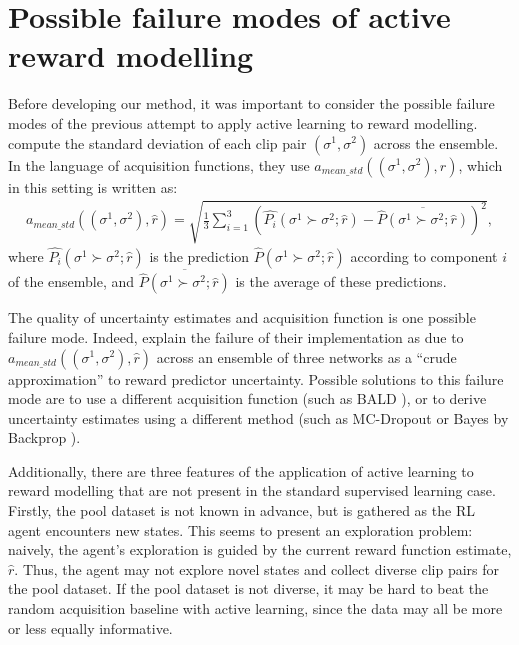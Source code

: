 \documentclass[11pt, a4paper, bibliography=totoc]{report}
\newcommand{\rp}{\hat{r}}
\begin{document}
\section{Possible failure modes of active reward modelling} \label{sec:failure}
Before developing our method, it was important to consider the possible failure modes of the previous attempt to apply active learning to reward modelling. \cite{Christiano2017} compute the standard deviation of each clip pair $(\sigma^1, \sigma^2)$ across the ensemble. In the language of acquisition functions, they use $ a_{mean\_std}((\sigma^1, \sigma^2), \rp) $, which in this setting is written as:
\begin{align*}
a_{mean\_std}((\sigma^1, \sigma^2), \rp) = \sqrt{\frac{1}{3}\sum_{i=1}^{3}\left(\hat{P_i}(\sigma^1 \succ \sigma^2  ; \rp) - \overline{\hat{P}(\sigma^1 \succ \sigma^2  ; \rp)}\right)^2},
\end{align*}
where $ \hat{P_i}(\sigma^1 \succ \sigma^2  ; \rp) $ is the prediction $ \hat{P}(\sigma^1 \succ \sigma^2  ; \rp) $ according to component $ i $ of the ensemble, and $ \overline{\hat{P}(\sigma^1 \succ \sigma^2  ; \rp)} $ is the average of these predictions.

The quality of uncertainty estimates and acquisition function is one possible failure mode. Indeed, \cite[p.~6]{Christiano2017} explain the failure of their implementation as due to $ a_{mean\_std}((\sigma^1, \sigma^2), \rp) $ across an ensemble of three networks as a ``crude approximation'' to reward predictor uncertainty. Possible solutions to this failure mode are to use a different acquisition function (such as BALD \cite{Houlsby2011}), or to derive uncertainty estimates using a different method (such as MC-Dropout \cite{Gal2015} or Bayes by Backprop \cite{Blundell2015}).

Additionally, there are three features of the application of active learning to reward modelling that are not present in the standard supervised learning case. Firstly, the pool dataset is not known in advance, but is gathered as the RL agent encounters new states. This seems to present an exploration problem: naively, the agent's exploration is guided by the current reward function estimate, $ \rp $. Thus, the agent may not explore novel states and collect diverse clip pairs for the pool dataset. If the pool dataset is not diverse, it may be hard to beat the random acquisition baseline with active learning, since the data may all be more or less equally informative.
\end{document}
